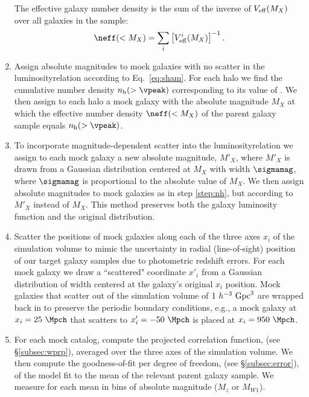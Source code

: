 \documentclass[twocolumn,apj,iop,tighten]{emulateapj2}
\begin{document}
\begin{enumerate}[leftmargin=0pt, itemindent=24pt, listparindent=10pt, label=(\arabic*), nosep]
The effective galaxy number density is the sum of the inverse of $V_{\rm eff}(M_X)$ over all galaxies in the sample:
%
\begin{equation}\label{eq:neff}
  \neff(<M_X) = \sum_i \left[ V^i_{\rm eff}(M_X) \right]^{-1}.
\end{equation}
%
\item \label{step:nh}
Assign absolute magnitudes to mock galaxies with no scatter in the luminosity\textendash \vpeak relation according to Eq.~\ref{eq:sham}. For each halo we find the cumulative number density $n_{\rm h}(>\vpeak)$ corresponding to its value of \vpeak. We then assign to each halo a mock galaxy with the absolute magnitude $M_X$ at which the effective number density $\neff(<M_X)$ of the parent galaxy sample equals $n_{\rm h}(>\vpeak)$.
%
\item \label{step:sham_scatter}
To incorporate magnitude-dependent scatter into the luminosity\textendash \vpeak relation we assign to each mock galaxy a new absolute magnitude, $M'_X$, where $M'_X$ is drawn from a Gaussian distribution centered at $M_X$ with width $\sigmamag$, where $\sigmamag$ is proportional to the absolute value of $M_X$. We then assign absolute magnitudes to mock galaxies as in step \ref{step:nh}, but according to $M'_X$ instead of $M_X$. This method preserves both the galaxy luminosity function and the original \vpeak distribution.
%
\item \label{step:los_scatter}
Scatter the positions of mock galaxies along each of the three axes $x_i$ of the simulation volume to mimic the uncertainty in radial (line-of-sight) position of our target galaxy samples due to photometric redshift errors. For each mock galaxy we draw a ``scattered" coordinate $x'_i$ from a Gaussian distribution of width \sigmalos centered at the galaxy's original $x_i$ position. Mock galaxies that scatter out of the simulation volume of $1~h^{-3}\ {\rm Gpc}^3$ are wrapped back in to preserve the periodic boundary conditions, e.g., a mock galaxy at $x_i=25~\Mpch$ that scatters to $x'_i=-50~\Mpch$ is placed at $x_i=950~\Mpch$.
%
\item \label{step:model_wp}
For each mock catalog, compute the projected correlation function, \wprp (see \S\ref{subsec:wprp}), averaged over the three axes of the simulation volume. We then compute the goodness-of-fit per degree of freedom, \chisqred (see \S\ref{subsec:error}), of the model fit to the mean \wprp of the relevant parent galaxy sample. We measure \chisqred for each mean \wprp in bins of absolute magnitude ($M_z$ or $M_{W1}$).

\end{enumerate}
\end{document}
